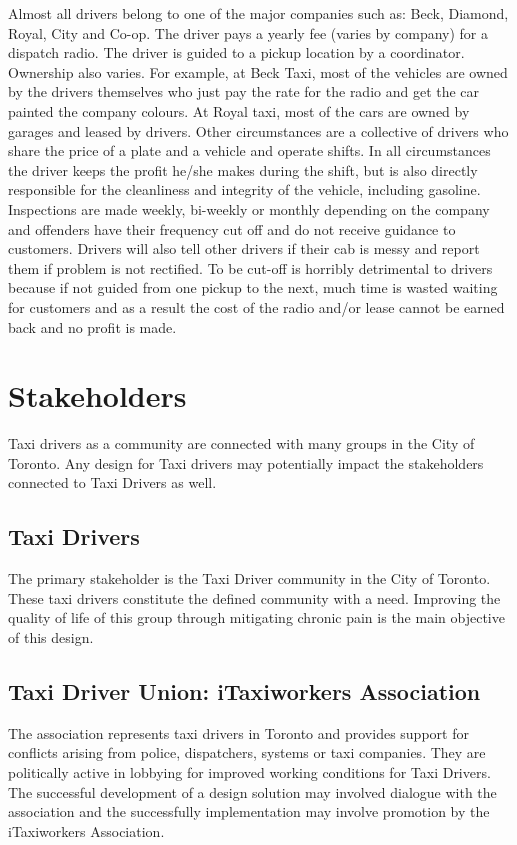 \documentclass[11pt]{article}
\begin{document}
Almost all drivers belong to one of the major companies such as: Beck, Diamond, Royal, City and
Co-op. The driver pays a yearly fee (varies by company) for a dispatch radio. The 
driver is guided to a pickup location by a coordinator. Ownership also varies. For example, 
at Beck Taxi, most of the vehicles are owned by the drivers themselves who just pay the 
rate for the radio and get the car painted the company colours. At Royal taxi, most of the 
cars are owned by garages and leased by drivers. Other circumstances are a collective of 
drivers who share the price of a plate and a vehicle and operate shifts. In all 
circumstances the driver keeps the profit he/she makes during the shift, but is also 
directly responsible for the cleanliness and integrity of the vehicle, including gasoline. 
Inspections are made weekly, bi-weekly or monthly depending on the company and offenders 
have their frequency cut off and do not receive guidance to customers. Drivers will also 
tell other drivers if their cab is messy and report them if problem is not rectified. To 
be cut-off is horribly detrimental to drivers because if not guided from one pickup to 
the next, much time is wasted waiting for customers and as a result the cost of the radio 
and/or lease cannot be earned back and no profit is made\cite{thestar2012, Gowder2013}.

\section{Stakeholders}
\label{sec:stake}
Taxi drivers as a community are connected with many groups in the City
of Toronto. Any design for Taxi drivers may potentially impact the
stakeholders connected to Taxi Drivers as well.
 
\subsection{Taxi Drivers}
The primary stakeholder is the Taxi Driver community in the City of
Toronto. These taxi drivers constitute the defined community with a
need. Improving the quality of life of this group through mitigating
chronic pain is the main objective of this design.
 
\subsection{Taxi Driver Union: iTaxiworkers Association}
The association represents taxi drivers in Toronto and provides
support for conflicts arising from police, dispatchers, systems or
taxi companies. They are politically active in lobbying for improved
working conditions for Taxi Drivers. The successful development of a
design solution may involved dialogue with the association and the
successfully implementation may involve promotion by the iTaxiworkers
Association\cite{itaxi}.
 
\end{document}
